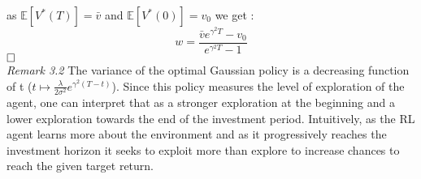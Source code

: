\documentclass[oneside, a4paper, onecolumn, 11pt]{article}
\begin{document}
as $\mathbb{E}[V^*(T)] = \bar{v}$ and $\mathbb{E}[V^*(0)] = v_0$ we get : 
\begin{equation*}
    w = \frac{\bar{v}e^{\gamma^2T} - v_0}{ e^{\gamma^2T} -1 } 
\end{equation*} 
$\hfill \square$
\\

\textit{Remark 3.2}
The variance of the optimal Gaussian policy is a decreasing function of t ($ t\mapsto \frac{\lambda}{2\sigma^2} e^{\gamma^2(T-t)}$). Since this policy measures the level of exploration of the agent, one can interpret that as a stronger exploration at the beginning and a lower exploration towards the end of the investment period. Intuitively, as the RL agent learns more about the environment and as it progressively reaches the investment horizon it seeks to exploit more than explore to increase chances to reach the given target return. 
\end{document}
